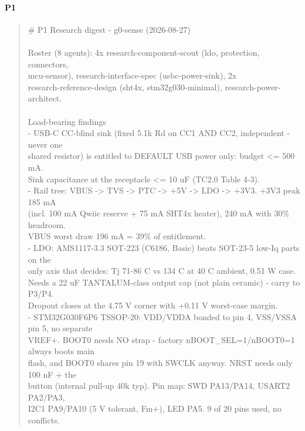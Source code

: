 \documentclass[11pt,a4paper]{article}
\begin{document}
\paragraph*{P1}
\begin{quote}\small\ttfamily\raggedright
\# P1 Research digest - g0-sense (2026-08-27)\\
~\\
Roster (8 agents): 4x research-component-scout (ldo, protection, connectors,\\
mcu-sensor), research-interface-spec (usbc-power-sink), 2x\\
research-reference-design (sht4x, stm32g030-minimal), research-power-architect.\\
~\\
Load-bearing findings\\
- USB-C CC-blind sink (fixed 5.1k Rd on CC1 AND CC2, independent - never one\\
  shared resistor) is entitled to DEFAULT USB power only: budget \textless{}= 500 mA.\\
  Sink capacitance at the receptacle \textless{}= 10 uF (TC2.0 Table 4-3).\\
- Rail tree: VBUS -\textgreater{} TVS -\textgreater{} PTC -\textgreater{} +5V -\textgreater{} LDO -\textgreater{} +3V3. +3V3 peak 185 mA\\
  (incl. 100 mA Qwiic reserve + 75 mA SHT4x heater), 240 mA with 30\% headroom.\\
  VBUS worst draw 196 mA = 39\% of entitlement.\\
- LDO: AMS1117-3.3 SOT-223 (C6186, Basic) beats SOT-23-5 low-Iq parts on the\\
  only axis that decides: Tj 71-86 C vs 134 C at 40 C ambient, 0.51 W case.\\
  Needs a 22 uF TANTALUM-class output cap (not plain ceramic) - carry to P3/P4.\\
  Dropout closes at the 4.75 V corner with +0.11 V worst-case margin.\\
- STM32G030F6P6 TSSOP-20: VDD/VDDA bonded to pin 4, VSS/VSSA pin 5, no separate\\
  VREF+. BOOT0 needs NO strap - factory nBOOT\_SEL=1/nBOOT0=1 always boots main\\
  flash, and BOOT0 shares pin 19 with SWCLK anyway. NRST needs only 100 nF + the\\
  button (internal pull-up 40k typ). Pin map: SWD PA13/PA14, USART2 PA2/PA3,\\
  I2C1 PA9/PA10 (5 V tolerant, Fm+), LED PA5. 9 of 20 pins used, no conflicts.\\

\end{quote}
\end{document}
